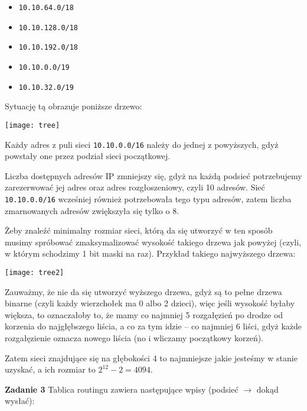 \documentclass[12pt,a4paper]{article}
\begin{document}
\begin{itemize}
	\item \texttt{10.10.64.0/18}
	\item \texttt{10.10.128.0/18}
	\item \texttt{10.10.192.0/18}
	\item \texttt{10.10.0.0/19}
	\item \texttt{10.10.32.0/19}
\end{itemize}

\noindent
Sytuację tą obrazuje poniższe drzewo:
\begin{center}
	\texttt{[image: tree]}
\end{center}


\noindent
Każdy adres z puli sieci \texttt{10.10.0.0/16} należy do jednej z powyższych, gdyż powstały one przez podział sieci początkowej.

Liczba dostępnych adresów IP zmniejszy się, gdyż na każdą podsieć potrzebujemy zarezerwować jej adres oraz adres rozgłoszeniowy, czyli 10 adresów. Sieć \texttt{10.10.0.0/16} wcześniej również potrzebowała tego typu adresów, zatem liczba zmarnowanych adresów zwiększyła się tylko o 8.

Żeby znaleźć minimalny rozmiar sieci, którą da się utworzyć w ten sposób musimy spróbować zmaksymalizować wysokość takiego drzewa jak powyżej (czyli, w którym schodzimy 1 bit maski na raz). Przykład takiego najwyższego drzewa:

\begin{center}
	\texttt{[image: tree2]}	
\end{center}

\noindent
Zauważmy, że nie da się utworzyć wyższego drzewa, gdyż są to pełne drzewa binarne (czyli każdy wierzchołek ma 0 albo 2 dzieci), więc jeśli wysokość byłaby większa, to oznaczałoby to, że mamy co najmniej 5 rozgałęzień po drodze od korzenia do najgłębszego liścia, a co za tym idzie -- co najmniej 6 liści, gdyż każde rozgałęzienie oznacza nowego liścia (no i wliczamy początkowy korzeń).

Zatem sieci znajdujące się na głębokości 4 to najmniejsze jakie jesteśmy w stanie uzyskać, a ich rozmiar to \( 2^{12} - 2 = 4094 \).

\newpage
\noindent
\textbf{Zadanie 3} Tablica routingu zawiera następujące wpisy (podsieć \(\rightarrow\) dokąd wysłać):
\end{document}

